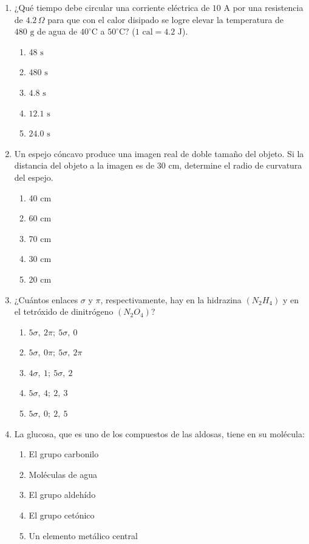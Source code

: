 \begin{enumerate}
\item ¿Qué tiempo debe circular una corriente eléctrica de $10\text{ A}$ por una resistencia de $4.2\,\Omega$ para que con el calor disipado se logre elevar la temperatura de $480\text{ g}$ de agua de $40^\circ\text{C}$ a $50^\circ\text{C}$? ($1\text{ cal} = 4.2\text{ J}$).

\begin{enumerate}[label=\alph*)]
	\item $48\text{ s}$
	\item $480\text{ s}$
	\item $4.8\text{ s}$
	\item $12.1\text{ s}$
	\item $24.0\text{ s}$
\end{enumerate}
	
	\item Un espejo cóncavo produce una imagen real de doble tamaño del objeto. Si la distancia del objeto a la imagen es de 30 cm, determine el radio de curvatura del espejo.
	\begin{enumerate}[label=\alph*)]
		\item 40 cm
		\item 60 cm
		\item 70 cm
		\item 30 cm
		\item 20 cm
	\end{enumerate}
	
	\item ¿Cuántos enlaces $\sigma$ y $\pi$, respectivamente, hay en la hidrazina $(N_2H_4)$ y en el tetróxido de dinitrógeno $(N_2O_4)$?
	\begin{enumerate}[label=\alph*)]
		\item $5\sigma,\ 2\pi;\ 5\sigma,\ 0$
		\item $5\sigma,\ 0\pi;\ 5\sigma,\ 2\pi$
		\item $4\sigma,\ 1;\ 5\sigma,\ 2$
		\item $5\sigma,\ 4;\ 2,\ 3$
		\item $5\sigma,\ 0;\ 2,\ 5$
	\end{enumerate}
	
	\item La glucosa, que es uno de los compuestos de las aldosas, tiene en su molécula:
	\begin{enumerate}[label=\alph*)]
		\item El grupo carbonilo
		\item Moléculas de agua
		\item El grupo aldehído
		\item El grupo cetónico
		\item Un elemento metálico central
	\end{enumerate}
	

\end{enumerate}
